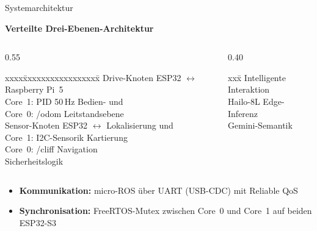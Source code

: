 \documentclass[aspectratio=169]{beamer}
\begin{document}
\begin{frame}[fragile]{Systemarchitektur}

  \textbf{Verteilte Drei-Ebenen-Architektur}

  \begin{columns}[T]
    \begin{column}{0.55\textwidth}
      {\small\ttfamily
      \begin{tabbing}
        xxxx\=xxxxxxxxxxxxxxxxx\=\kill
        Drive-Knoten ESP32 \> $\longleftrightarrow$ \> Raspberry Pi~5\\
        \> Core~1: PID 50\,Hz \> Bedien- und\\
        \> Core~0: /odom \> Leitstandsebene\\[4pt]
        Sensor-Knoten ESP32 \> $\longleftrightarrow$ \> Lokalisierung und\\
        \> Core~1: I2C-Sensorik \> Kartierung\\
        \> Core~0: /cliff \> Navigation\\
        \> \> Sicherheitslogik
      \end{tabbing}}
    \end{column}
    \begin{column}{0.40\textwidth}
      {\small\ttfamily
      \begin{tabbing}
        xxx\=\kill
        Intelligente Interaktion\\
        \> Hailo-8L Edge-Inferenz\\
        \> Gemini-Semantik
      \end{tabbing}}
    \end{column}
  \end{columns}

  \vspace{0.5em}
  \begin{itemize}
    \item \textbf{Kommunikation:} micro-ROS über UART (USB-CDC) mit
          Reliable QoS
    \item \textbf{Synchronisation:} FreeRTOS-Mutex zwischen Core~0 und
          Core~1 auf beiden ESP32-S3
  \end{itemize}

\end{frame}
\end{document}
